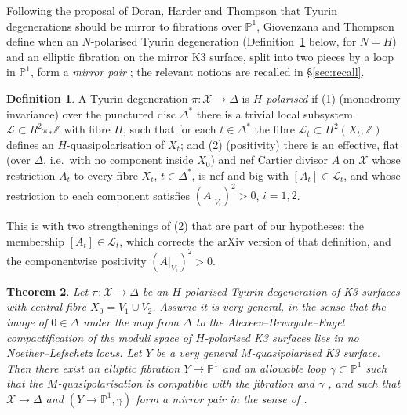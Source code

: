 \documentclass[12pt]{article}
\newcommand{\Z}{\mathbb Z}
\newcommand{\PP}{\mathbb P}
\newcommand{\calX}{\mathcal X}
\newcommand{\calL}{\mathcal L}
\newtheorem{theorem}{Theorem}[section]
\theoremstyle{definition}
\newtheorem{definition}[theorem]{Definition}
\theoremstyle{remark}
\begin{document}
Following the proposal of Doran, Harder and Thompson \cite{DHT} that
Tyurin degenerations should be mirror to fibrations over \(\PP^1\),
Giovenzana and Thompson \cite{GT} define when an \(N\)-polarised
Tyurin degeneration (Definition~\ref{def:Hpol} below, for \(N=H\)) and
an elliptic fibration on the mirror K3 surface, split into two pieces
by a loop in \(\PP^1\), form a \emph{mirror pair}
\cite[Definition~5.1]{GT}; the relevant notions are recalled in
\S\ref{sec:recall}.

\begin{definition}\label{def:Hpol}
A Tyurin degeneration \(\pi\colon\calX\to\Delta\) is
\emph{\(H\)-polarised} if
(1) (monodromy invariance) over the punctured disc \(\Delta^*\)
there is a trivial local subsystem \(\calL\subset R^2\pi_*\Z\) with
fibre \(H\), such that for each \(t\in\Delta^*\) the fibre
\(\calL_t\subset H^2(X_t;\Z)\) defines an \(H\)-quasipolarisation of
\(X_t\); and
(2) (positivity) there is an effective, flat (over \(\Delta\), i.e.\
with no component inside \(X_0\)) and nef Cartier divisor
\(A\) on \(\calX\) whose restriction \(A_t\) to every fibre \(X_t\),
\(t\in\Delta^*\), is nef and big with \([A_t]\in\calL_t\), and whose
restriction to each component satisfies \((A|_{V_i})^2>0\),
\(i=1,2\).
\end{definition}

This is \cite[Definition~3.20]{GT} with two strengthenings of (2)
that are part of our hypotheses: the membership \([A_t]\in\calL_t\),
which corrects the arXiv version of that definition, and the
componentwise positivity \((A|_{V_i})^2>0\).

\begin{theorem}\label{thm:main}
Let \(\pi\colon\calX\to\Delta\) be an \(H\)-polarised Tyurin
degeneration of K3 surfaces with central fibre \(X_0=V_1\cup V_2\).
Assume it is very general, in the sense that the image of
\(0\in\Delta\) under the map from \(\Delta\) to the
Alexeev--Brunyate--Engel compactification \cite{ABE} of the moduli
space of \(H\)-polarised K3 surfaces lies in no Noether--Lefschetz
locus. Let \(Y\) be a very general \(M\)-quasipolarised K3 surface.
Then there exist an elliptic fibration \(Y\to\PP^1\) and an allowable
loop \(\gamma\subset\PP^1\) \cite[Definition~4.11]{GT} such that the
\(M\)-quasipolarisation is compatible with the fibration and
\(\gamma\) \cite[Definition~4.21]{GT}, and such that \(\calX\to\Delta\)
and \((Y\to\PP^1,\gamma)\) form a mirror pair in the sense of
\cite[Definition~5.1]{GT}.
\end{theorem}
\end{document}
